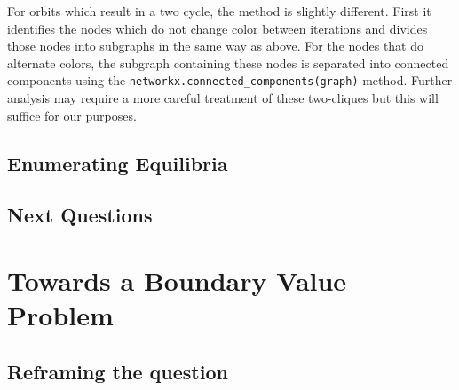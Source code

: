 \documentclass[]{article}
\begin{document}
For orbits which result in a two cycle, the method is slightly different. First it identifies the nodes which do not change color between iterations and divides those nodes into subgraphs in the same way as above. For the nodes that do alternate colors, the subgraph containing these nodes is separated into connected components using the \verb*|networkx.connected_components(graph)| method. Further analysis may require a more careful treatment of these two-cliques but this will suffice for our purposes. 
\subsection{Enumerating Equilibria}
\subsection{Next Questions}
\section{Towards a Boundary Value Problem}
\subsection{Reframing the question}
\end{document}
